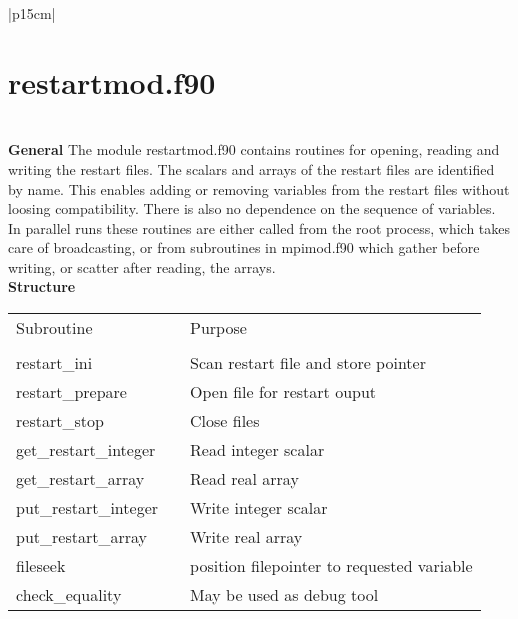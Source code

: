 \newpage

\begin{center}
\begin{tabular}{|p{15cm}|}
\hline
\vspace{-5mm} \section{restartmod.f90} \vspace{-5mm} \\
\hline
\vspace{1mm} {\bf General} The module {\module restartmod.f90}
contains routines for opening, reading and writing the restart files.
The scalars and arrays of the restart files
are identified by name. This enables adding or removing
variables from the restart files without loosing compatibility.
There is also no dependence on the sequence of variables.
In parallel runs 
these routines are either called from the root process,
which takes care of broadcasting, or from subroutines in
{\module mpimod.f90} which gather before writing,
or scatter after reading, the arrays.
\vspace{3mm} \\
\hline
\vspace{2mm} {\bf Structure}
\begin{center}
\begin{tabular}{l p{2cm} l}
Subroutine & &Purpose \\
&& \\
{\sub restart\_ini} && Scan restart file and store pointer \\
{\sub restart\_prepare} && Open file for restart ouput \\
{\sub restart\_stop} && Close files \\
{\sub get\_restart\_integer} && Read integer scalar \\
{\sub get\_restart\_array} && Read real array \\
{\sub put\_restart\_integer} &&  Write integer scalar \\
{\sub put\_restart\_array}   && Write real array \\
{\sub fileseek} && position filepointer to requested variable \\
{\sub check\_equality} && May be used as debug tool \\
\end{tabular}
\end{center}

\vspace{3mm} \\
\hline
\end{tabular}
\end{center}
\newpage

